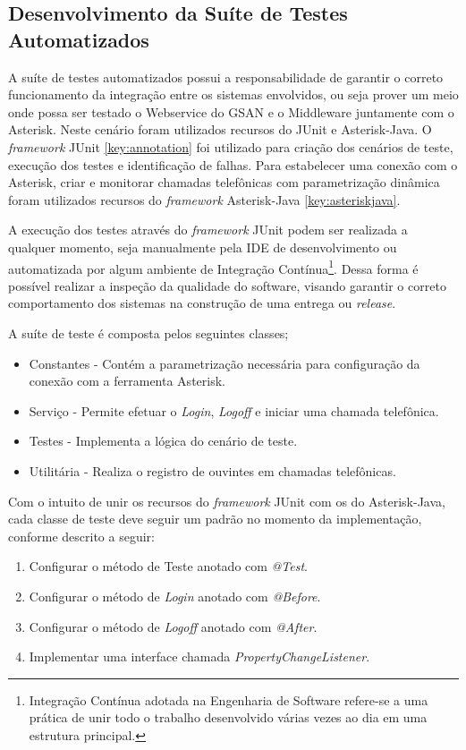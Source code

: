 \subsection{\textbf{Desenvolvimento da Suíte de Testes Automatizados}}

A suíte de testes automatizados possui a responsabilidade de garantir o correto funcionamento da integração entre os sistemas envolvidos, ou seja prover um meio onde possa ser testado o Webservice do GSAN e o Middleware juntamente com o Asterisk. 
Neste cenário foram utilizados recursos do JUnit e Asterisk-Java. O \textit{framework} JUnit \ref{key:annotation} foi utilizado para criação dos cenários de teste, execução dos testes e identificação de falhas. Para estabelecer uma conexão com o Asterisk, criar e monitorar chamadas telefônicas com parametrização dinâmica foram utilizados recursos do \textit{framework} Asterisk-Java \ref{key:asteriskjava}.  

A execução dos testes através do \textit{framework} JUnit podem ser realizada a qualquer momento, seja manualmente pela IDE de desenvolvimento ou automatizada por algum ambiente de Integração Contínua\footnote{Integração Contínua adotada na Engenharia de Software refere-se a uma prática de unir todo o trabalho desenvolvido várias vezes ao dia em uma estrutura principal.}. Dessa forma é possível realizar a inspeção da qualidade do software, visando garantir o correto comportamento dos sistemas na construção de uma entrega ou \textit{release}.

A suíte de teste é composta pelos seguintes classes;
\begin{itemize}
	\item Constantes - Contém a parametrização necessária para configuração da conexão com a ferramenta Asterisk.
	\item Serviço - Permite efetuar o \textit{Login}, \textit{Logoff} e iniciar uma chamada telefônica.
	\item Testes - Implementa a lógica do cenário de teste.
	\item Utilitária - Realiza o registro de ouvintes em chamadas telefônicas.
\end{itemize}


Com o intuito de unir os recursos do \textit{framework} JUnit com os do Asterisk-Java, cada classe de teste deve seguir um padrão no momento da implementação, conforme descrito a seguir:

\begin{enumerate}
	\item Configurar o método de Teste anotado com \textit{@Test}.
	\item Configurar o método de \textit{Login} anotado com \textit{@Before}.
	\item Configurar o método de \textit{Logoff} anotado com \textit{@After}.
	\item Implementar uma interface chamada \textit{PropertyChangeListener}.	
\end{enumerate}

